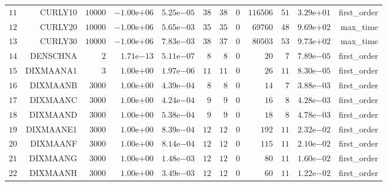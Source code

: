 \begin{longtable}{rrrrrrrrrrrr}
  \(    11\) & CURLY10 & \( 10000\) & \(-1.00\)e\(+06\) & \( 5.25\)e\(-05\) & \(    38\) & \(    38\) & \(     0\) & \(116506\) & \(    51\) & \( 3.29\)e\(+01\) & first\_order \\
  \(    12\) & CURLY20 & \( 10000\) & \(-1.00\)e\(+06\) & \( 5.65\)e\(-03\) & \(    35\) & \(    35\) & \(     0\) & \( 69760\) & \(    48\) & \( 9.69\)e\(+02\) & max\_time \\
  \(    13\) & CURLY30 & \( 10000\) & \(-1.00\)e\(+06\) & \( 7.83\)e\(-03\) & \(    38\) & \(    37\) & \(     0\) & \( 80503\) & \(    53\) & \( 9.73\)e\(+02\) & max\_time \\
  \(    14\) & DENSCHNA & \(     2\) & \( 1.71\)e\(-13\) & \( 5.11\)e\(-07\) & \(     8\) & \(     8\) & \(     0\) & \(    20\) & \(     7\) & \( 7.89\)e\(-05\) & first\_order \\
  \(    15\) & DIXMAANA1 & \(     3\) & \( 1.00\)e\(+00\) & \( 1.97\)e\(-06\) & \(    11\) & \(    11\) & \(     0\) & \(    26\) & \(    11\) & \( 8.30\)e\(-05\) & first\_order \\
  \(    16\) & DIXMAANB & \(  3000\) & \( 1.00\)e\(+00\) & \( 4.39\)e\(-04\) & \(     8\) & \(     8\) & \(     0\) & \(    14\) & \(     7\) & \( 3.88\)e\(-03\) & first\_order \\
  \(    17\) & DIXMAANC & \(  3000\) & \( 1.00\)e\(+00\) & \( 4.24\)e\(-04\) & \(     9\) & \(     9\) & \(     0\) & \(    16\) & \(     8\) & \( 4.28\)e\(-03\) & first\_order \\
  \(    18\) & DIXMAAND & \(  3000\) & \( 1.00\)e\(+00\) & \( 5.38\)e\(-04\) & \(     9\) & \(     9\) & \(     0\) & \(    18\) & \(     8\) & \( 4.78\)e\(-03\) & first\_order \\
  \(    19\) & DIXMAANE1 & \(  3000\) & \( 1.00\)e\(+00\) & \( 8.39\)e\(-04\) & \(    12\) & \(    12\) & \(     0\) & \(   192\) & \(    11\) & \( 2.32\)e\(-02\) & first\_order \\
  \(    20\) & DIXMAANF & \(  3000\) & \( 1.00\)e\(+00\) & \( 8.14\)e\(-04\) & \(    12\) & \(    12\) & \(     0\) & \(   115\) & \(    11\) & \( 2.10\)e\(-02\) & first\_order \\
  \(    21\) & DIXMAANG & \(  3000\) & \( 1.00\)e\(+00\) & \( 1.48\)e\(-03\) & \(    12\) & \(    12\) & \(     0\) & \(    80\) & \(    11\) & \( 1.60\)e\(-02\) & first\_order \\
  \(    22\) & DIXMAANH & \(  3000\) & \( 1.00\)e\(+00\) & \( 3.49\)e\(-03\) & \(    12\) & \(    12\) & \(     0\) & \(    60\) & \(    11\) & \( 1.22\)e\(-02\) & first\_order \\

\end{longtable}
